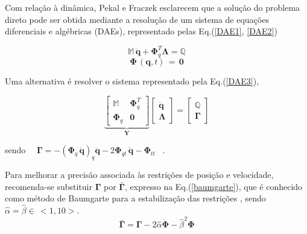 \documentclass[]{politex}
\begin{document}
Com relação à dinâmica, Pekal e Fraczek \cite{pekal} esclarecem que a solução do problema direto pode ser obtida mediante a resolução de um sistema de equações diferenciais e algébricas (DAEs), representado pelas Eq.(\ref{DAE1}, \ref{DAE2})

\begin{equation}
\mathbb{M} \, \ddot{\mathbf{q}} + \boldsymbol{\Phi}_q^T \boldsymbol{\Lambda} = \mathbb{Q}
\label{DAE1}
\end{equation}
%
\begin{equation}
\boldsymbol{\Phi} \, (\mathbf{q},t) \, = \, \mathbf{0}
\label{DAE2}
\end{equation}

Uma alternativa é resolver o sistema representado pela Eq.(\ref{DAE3}), 

\begin{equation}
\underbrace{\left[ \begin{array}{cc}
\mathbb{M} & \boldsymbol{\Phi}_q^T \\
\boldsymbol{\Phi}_q & \mathbf{0}
\end{array}
\right]}_{\mathbf{Y}}
\left[ \begin{array}{c}
\ddot{\mathbf{q}} \\
\boldsymbol{\Lambda}
\end{array}
\right] =
\left[ \begin{array}{c}
\mathbb{Q} \\
\boldsymbol{\Gamma}
\end{array}
\right]
\label{DAE3}
\end{equation}

\vspace{0.5cm}

sendo  \, \, $\boldsymbol{\Gamma} = -(\boldsymbol{\Phi}_q \, \dot{\mathbf{q}})_q \dot{\mathbf{q}} - 2 \boldsymbol{\Phi}_{qt} \, \dot{\mathbf{q}} - \boldsymbol{\Phi}_{tt}$ \, .

\vspace{0.5cm}

Para melhorar a precisão associada às restrições de posição e velocidade, recomenda-se substituir $\boldsymbol{\Gamma}$ por $\bar{\boldsymbol{\Gamma}}$, expresso na Eq.(\ref{baumgarte}), que é conhecido como método de Baumgarte para a estabilização das restrições \cite{nikravesh}, sendo $\hat{\alpha} = \hat{\beta} \in \, <1,10>$. 
%
\begin{equation}
\bar{\boldsymbol{\Gamma}} = \boldsymbol{\Gamma} - 2\hat{\alpha} \boldsymbol{\dot{\Phi}} - \hat{\beta}^2 \boldsymbol{\Phi}
\label{baumgarte}
\end{equation}
\end{document}
